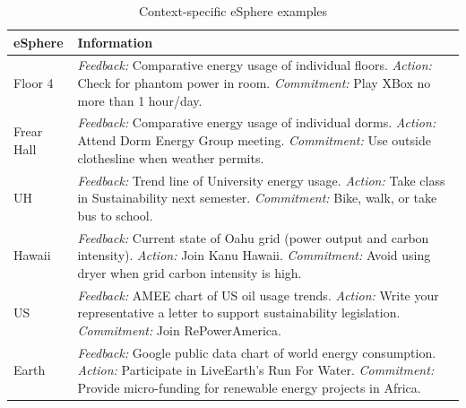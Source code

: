 \begin{table}[ht]
\centering
\small
 \begin{tabular}{|p{.60in}|p{5.5in}|}
  \hline
  {\bf eSphere} & {\bf Information} \\ \hline
Floor 4 & 
{\em Feedback:} Comparative energy usage of individual floors. \newline
{\em Action:} Check for phantom power in room. \newline
{\em Commitment:} Play XBox no more than 1 hour/day.
\\ \hline

Frear Hall & 
{\em Feedback:} Comparative energy usage of individual dorms. \newline
{\em Action:} Attend Dorm Energy Group meeting. \newline
{\em Commitment:} Use outside clothesline when weather permits.
\\ \hline

UH & 
{\em Feedback:} Trend line of University energy usage.\newline
{\em Action:} Take class in Sustainability next semester. \newline
{\em Commitment:} Bike, walk, or take bus to school.
\\ \hline

Hawaii & 
{\em Feedback:} Current state of Oahu grid (power output and carbon intensity). \newline
{\em Action:} Join Kanu Hawaii. \newline
{\em Commitment:} Avoid using dryer when grid carbon intensity is high.
\\ \hline

US & 
{\em Feedback:} AMEE chart of US oil usage trends. \newline
{\em Action:} Write your representative a letter to support sustainability legislation. \newline
{\em Commitment:} Join RePowerAmerica.
\\ \hline

Earth & 
{\em Feedback:} Google public data chart of world energy consumption. \newline
{\em Action:} Participate in LiveEarth's Run For Water. \newline
{\em Commitment:}  Provide micro-funding for renewable energy projects in Africa.  
\\ \hline

\end{tabular}
\caption{Context-specific eSphere examples}
\label{table:esphere-examples} 
\end{table}


